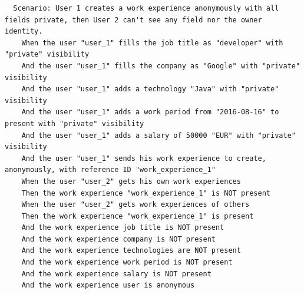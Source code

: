 \documentclass[a4paper, 12pt]{book}
\begin{document}
{\begin{verbatim}
  Scenario: User 1 creates a work experience anonymously with all fields private, then User 2 can't see any field nor the owner identity.
    When the user "user_1" fills the job title as "developer" with "private" visibility
    And the user "user_1" fills the company as "Google" with "private" visibility
    And the user "user_1" adds a technology "Java" with "private" visibility
    And the user "user_1" adds a work period from "2016-08-16" to present with "private" visibility
    And the user "user_1" adds a salary of 50000 "EUR" with "private" visibility
    And the user "user_1" sends his work experience to create, anonymously, with reference ID "work_experience_1"
    When the user "user_2" gets his own work experiences
    Then the work experience "work_experience_1" is NOT present
    When the user "user_2" gets work experiences of others
    Then the work experience "work_experience_1" is present
    And the work experience job title is NOT present
    And the work experience company is NOT present
    And the work experience technologies are NOT present
    And the work experience work period is NOT present
    And the work experience salary is NOT present
    And the work experience user is anonymous

        \end{verbatim}
    }
\end{document}
